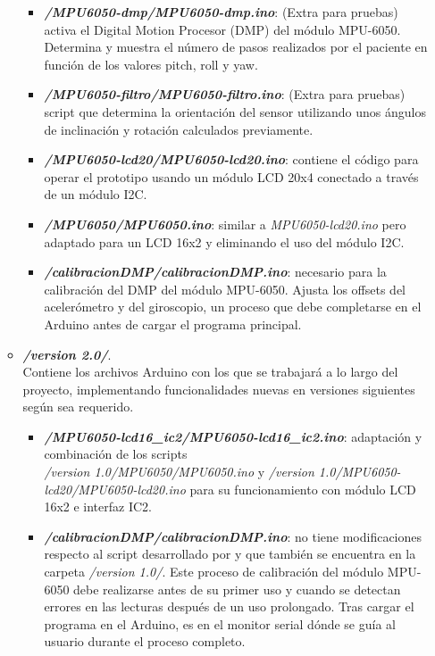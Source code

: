 \begin{itemize}
\begin{itemize}
        \begin{itemize}
            \item \textbf{\textit{/MPU6050-dmp/MPU6050-dmp.ino}}: (Extra para pruebas) activa el Digital Motion Procesor (DMP) del módulo MPU-6050. Determina y muestra el número de pasos realizados por el paciente en función de los valores pitch, roll y yaw.
            \item \textbf{\textit{/MPU6050-filtro/MPU6050-filtro.ino}}: (Extra para pruebas) script que determina la orientación del sensor utilizando unos ángulos de inclinación y rotación calculados previamente.
            \item \textbf{\textit{/MPU6050-lcd20/MPU6050-lcd20.ino}}: contiene el código para operar el prototipo usando un módulo LCD 20x4 conectado a través de un módulo I2C.
            \item \textbf{\textit{/MPU6050/MPU6050.ino}}: similar a \textit{MPU6050-lcd20.ino} pero adaptado para un LCD 16x2 y eliminando el uso del módulo I2C.
            \item \textbf{\textit{/calibracionDMP/calibracionDMP.ino}}: necesario para la calibración del DMP del módulo MPU-6050. Ajusta los offsets del acelerómetro y del giroscopio, un proceso que debe completarse en el Arduino antes de cargar el programa principal.
        \end{itemize}
        \item \textbf{\textit{/version 2.0/}}.\\
        Contiene los archivos Arduino con los que se trabajará a lo largo del proyecto, implementando funcionalidades nuevas en versiones siguientes según sea requerido.
        \begin{itemize}
            \item \textbf{\textit{/MPU6050-lcd16\_ic2/MPU6050-lcd16\_ic2.ino}}: adaptación y combinación de los scripts \\\textit{/version 1.0/MPU6050/MPU6050.ino} y \textit{/version 1.0/MPU6050-lcd20/MPU6050-lcd20.ino} para su funcionamiento con módulo LCD 16x2 e interfaz IC2.
            \item \textbf{\textit{/calibracionDMP/calibracionDMP.ino}}: no tiene modificaciones respecto al script desarrollado por \cite{saragonz91:online} y que también se encuentra en la carpeta \textit{/version 1.0/}. Este proceso de calibración del módulo MPU-6050 debe realizarse antes de su primer uso y cuando se detectan errores en las lecturas después de un uso prolongado. Tras cargar el programa en el Arduino, es en el monitor serial dónde se guía al usuario durante el proceso completo.

\end{itemize}
\end{itemize}
\end{itemize}
